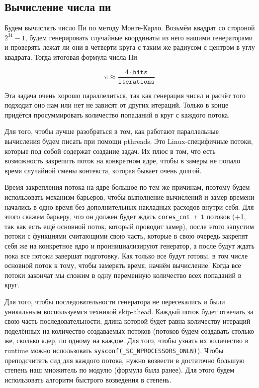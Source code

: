 \documentclass[12pt]{extarticle}
\begin{document}
\subsection{Вычисление числа пи}

Будем вычислять число Пи по методу Монте-Карло. Возьмём квадрат со стороной $2^31 - 1$, будем генерировать случайные координаты из него нашими генераторами и проверять лежат ли они в четверти круга с таким же радиусом с центром в углу квадрата. Тогда итоговая формула числа Пи

\begin{equation}
    \pi \approx \frac{4 \cdot \texttt{hits}}{\texttt{iterations}} 
\end{equation}

Эта задача очень хорошо параллелиться, так как генерация чисел и расчёт того подходит оно нам или нет не зависят от других итераций. Только в конце придётся просуммировать количество попаданий в круг с каждого потока.

Для того, чтобы лучше разобраться в том, как работают параллельные вычисления будем писать при помощи pthreads. Это Linux-специфичные потоки, которые под собой содержат создание задач. Их плюс в том, что есть возможность закрепить поток на конкретном ядре, чтобы в замеры не попало время случайной смены контекста, которая бывает очень долгой. 

Время закрепления потока на ядре большое по тем же причинам, поэтому будем использовать механизм барьеров, чтобы выполнение вычислений и замер времени начались в одно время без дополнительных накладных расходов внутри себя. Для этого скажем барьеру, что он должен будет ждать \texttt{cores_cnt + 1} потоков (+1, так как есть ещё основной поток, который проводит замер), после этого запустим потоки с функциями считающими свою часть, которые в свою очередь закрепят себя же на конкретное ядро и проинициализируют генератор, а после будут ждать пока все потоки завершат подготовку. Как только все будут готовы, в том числе основной поток к тому, чтобы замерять время, начнём вычисление. Когда все потоки закончат мы сложим в одну переменную количество всех попаданий в круг.

Для того, чтобы последовательности генератора не пересекались и были уникальным воспользуемся техникой skip-ahead. Каждый поток будет отвечать за свою часть последовательности, длина которой будет равна количеству итераций поделённых на количество создаваемых потоков (потоков будем создавать столько же, сколько ядер, по одному на каждое. Для того, чтобы узнать их количество в runtime можно использовать \texttt{sysconf(\_SC\_NPROCESSORS\_ONLN)}). Чтобы преподсчитать сид для каждого потока, нужно возвести в достаточно большую степень наш множитель по модулю (формула была ранее). Для этого будем использовать алгоритм быстрого возведения в степень.
\end{document}
